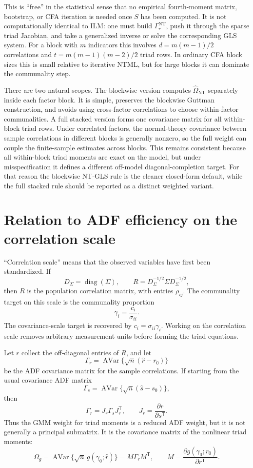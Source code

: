 \documentclass[11pt]{article}
\newcommand{\T}{^{\mathsf T}}
\newcommand{\diag}{\operatorname{diag}}
\theoremstyle{plain}
\theoremstyle{remark}
\begin{document}
This is ``free'' in the statistical sense that no empirical fourth-moment
matrix, bootstrap, or CFA iteration is needed once \(S\) has been computed.
It is not computationally identical to ILM: one must build
\(\Gamma_r^{\mathrm{NT}}\), push it through the sparse triad Jacobian, and take
a generalized inverse or solve the corresponding GLS system. For a block with
\(m\) indicators this involves \(d=m(m-1)/2\) correlations and
\(t=m(m-1)(m-2)/2\) triad rows. In ordinary CFA block sizes this is small
relative to iterative NTML, but for large blocks it can dominate the
communality step.

There are two natural scopes. The blockwise version computes
\(\widehat\Omega_{\mathrm{NT}}\) separately inside each factor block. It is
simple, preserves the blockwise Guttman construction, and avoids using
cross-factor correlations to choose within-factor communalities. A full stacked
version forms one covariance matrix for all within-block triad rows. Under
correlated factors, the normal-theory covariance between sample correlations in
different blocks is generally nonzero, so the full weight can couple the
finite-sample estimates across blocks. This remains consistent because all
within-block triad moments are exact on the model, but under misspecification it
defines a different off-model diagonal-completion target. For that reason the
blockwise NT-GLS rule is the cleaner closed-form default, while the full stacked
rule should be reported as a distinct weighted variant.

\section{Relation to ADF efficiency on the correlation scale}

``Correlation scale'' means that the observed variables have first been
standardized. If
\[
  D_\Sigma=\diag(\Sigma),
  \qquad
  R=D_\Sigma^{-1/2}\Sigma D_\Sigma^{-1/2},
\]
then \(R\) is the population correlation matrix, with entries
\(\rho_{ij}\). The communality target on this scale is the communality
proportion
\[
  \gamma_i=\frac{c_i}{\sigma_{ii}}.
\]
The covariance-scale target is recovered by \(c_i=\sigma_{ii}\gamma_i\).
Working on the correlation scale removes arbitrary measurement units before
forming the triad equations.

Let \(r\) collect the off-diagonal entries of \(R\), and let
\[
  \Gamma_r
  =
  \operatorname{AVar}\{\sqrt n(\hat r-r_0)\}
\]
be the ADF covariance matrix for the sample correlations. If starting from the
usual covariance ADF matrix
\[
  \Gamma_s=\operatorname{AVar}\{\sqrt n(\hat s-s_0)\},
\]
then
\[
  \Gamma_r=J_r\Gamma_sJ_r\T,
  \qquad
  J_r=\frac{\partial r}{\partial s\T}.
\]
Thus the GMM weight for triad moments is a reduced ADF weight, but it is not
generally a principal submatrix. It is the covariance matrix of the nonlinear
triad moments:
\[
  \Omega_g
  =
  \operatorname{AVar}\{\sqrt n\,g(\gamma_0;\hat r)\}
  =
  M\Gamma_rM\T,
  \qquad
  M=\frac{\partial g(\gamma_0;r_0)}{\partial r\T}.
\]
\end{document}
